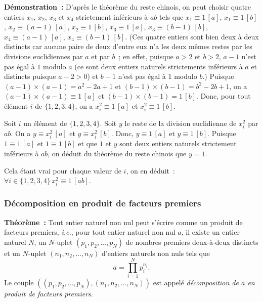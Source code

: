 \noindent\textbf{Démonstration :} 
    D'après le théorème du reste chinois, on peut choisir quatre entiers $x_1$, $x_2$, $x_3$ et $x_4$ strictement inférieurs à $ab$ tels que $x_1 \equiv 1 \, [a]$, $x_1 \equiv 1 \, [b]$, $x_2 \equiv (a-1) \, [a]$, $x_2 \equiv 1 \, [b]$, $x_3 \equiv 1 \, [a]$, $x_3 \equiv (b-1) \, [b]$, $x_4 \equiv (a-1) \, [a]$, $x_4 \equiv (b-1) \, [b]$. 
    (Ces quatre entiers sont bien deux à deux distincts car aucune paire de deux d'entre eux n'a les deux mêmes restes par les divisions euclidiennes par $a$ et par $b$ ; en effet, puisque $a>2$ et $b > 2$, $a-1$ n'est pas égal à $1$ modulo $a$ (ce sont deux entiers naturels strictements inférieurs à $a$ et distincts puisque $a-2 > 0$) et $b-1$ n'est pas égal à $1$ modulo $b$.) 
    Puisque $(a-1) \times (a-1) = a^2 - 2 a + 1$ et $(b-1) \times (b-1) = b^2 - 2 b + 1$, on a $(a-1) \times (a-1) \equiv 1 \, [a]$ et $(b-1) \times (b-1) = 1 \, [b]$.
    Donc, pour tout élément $i$ de $\lbrace 1, 2, 3, 4 \rbrace$, on a $x_i^2 \equiv 1 \, [a]$ et $x_i^2 \equiv 1 \, [b]$. 
    
    Soit $i$ un élément de $\lbrace 1, 2, 3, 4 \rbrace$. 
    Soit $y$ le reste de la division euclidienne de $x_i^2$ par $ab$. 
    On a $y \equiv x_i^2 \, [a]$ et $y \equiv x_i^2 \, [b]$. 
    Donc, $y \equiv 1 \, [a]$ et $y \equiv 1 \, [b]$. 
    Puisque $1 \equiv 1 \, [a]$ et $1 \equiv 1 \, [b]$ et que $1$ et $y$ sont deux entiers naturels strictement inférieurs à $a b$, on déduit du théorème du reste chinois que $y = 1$.  

    Cela étant vrai pour chaque valeur de $i$, on en déduit : $\forall i \in \lbrace 1, 2, 3, 4 \rbrace \, x_i^2 \equiv 1 \, [a b]$.

\done


\subsubsection{Décomposition en produit de facteurs premiers}
\label{subsub:dec_fact_prem}

\bigskip

\noindent\textbf{Théorème :} 
Tout entier naturel non nul peut s'écrire comme un produit de facteurs premiers, \textit{i.e.}, pour tout entier naturel non nul $a$, il existe un entier naturel $N$, un $N$-uplet $\left( p_1, p_2, \dots, p_N \right)$ de nombres premiers deux-à-deux distincts et un $N$-uplet $\left( n_1, n_2, \dots, n_N \right)$ d'entiers naturels non nuls tels que
\begin{equation*}
    a = \prod_{i=1}^N p_i^{n_i}.
\end{equation*}
Le couple $\left( \left( p_1, p_2, \dots, p_N \right), \left( n_1, n_2, \dots, n_N \right)\right)$ est appelé \textit{décomposition de $a$ en produit de facteurs premiers}.

